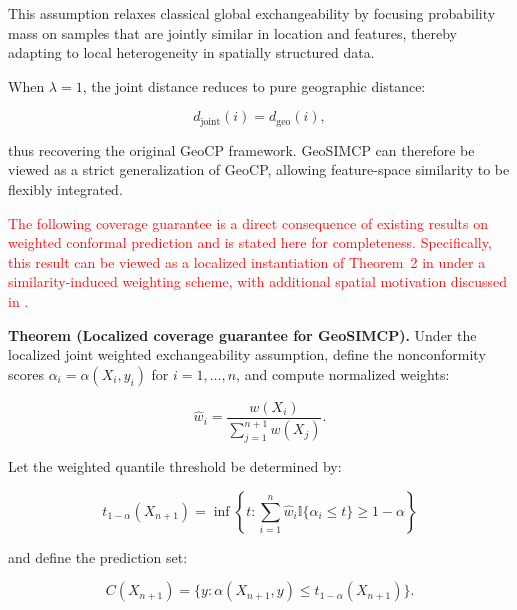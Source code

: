 \documentclass[authoryear,preprint,review,12pt]{elsarticle}
\begin{document}
This assumption relaxes classical global exchangeability by focusing probability mass on samples that are jointly similar in location and features, thereby adapting to local heterogeneity in spatially structured data.

\vspace{0.5em}


When \(\lambda=1\), the joint distance reduces to pure geographic distance:

\[
d_{\text{joint}}(i) = d_{\text{geo}}(i),
\]

thus recovering the original GeoCP framework.  
GeoSIMCP can therefore be viewed as a strict generalization of GeoCP, allowing feature-space similarity to be flexibly integrated.


\textcolor{red}{The following coverage guarantee is a direct consequence of existing results on weighted conformal prediction and is stated here for completeness. Specifically, this result can be viewed as a localized instantiation of Theorem~2 in \citep{tibshirani2019conformal} under a similarity-induced weighting scheme, with additional spatial motivation discussed in \citet{lou2025geoxcp}.}

\textbf{Theorem (Localized coverage guarantee for GeoSIMCP).}  
Under the localized joint weighted exchangeability assumption, define the nonconformity scores \(\alpha_i = \alpha(X_i, y_i)\) for \(i = 1, \dots, n\), and compute normalized weights:

\begin{equation}
\hat{w}_i = \frac{w(X_i)}{\sum_{j=1}^{n+1} w(X_j)}.
\end{equation}

Let the weighted quantile threshold be determined by:


\begin{equation}
t_{1-\alpha}(X_{n+1}) = \inf \left\{ t : \sum_{i=1}^{n} \hat{w}_i \mathbb{I} \{ \alpha_i \leq t \} \geq 1-\alpha \right\}
\end{equation}

and define the prediction set:

\begin{equation}
C(X_{n+1}) = \{ y : \alpha(X_{n+1}, y) \leq t_{1-\alpha}(X_{n+1})\}.
\end{equation}
\end{document}
